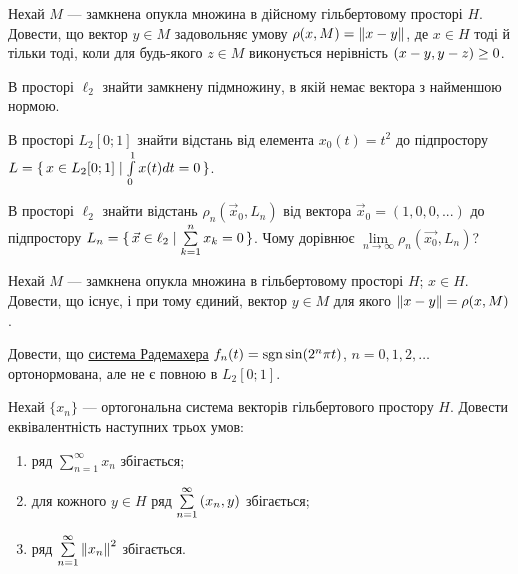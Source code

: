 \begin{exercise}
    Нехай $M$ --- замкнена опукла множина в дійсному гільбертовому просторі $H$.
    Довести, що вектор $y \in M$ задовольняє умову $\rho(x, M) = \left\lVert x-y\right\rVert$,
    де $x \in H$ тоді й тільки тоді, коли для будь-якого $z \in M$ виконується
    нерівність $\left(x-y, y-z\right) \geq 0$.
\end{exercise}

\begin{exercise}\label{N:1_2_21}
    В просторі $\ell_2$ знайти замкнену підмножину, в якій немає вектора з найменшою нормою.
\end{exercise}

\begin{exercise}
    В просторі $L_2[0;1]$ знайти відстань від елемента $x_0(t) = t^2$ до підпростору
    $L = \set{x \in L_2[0;1] \mid \int\limits_0^1x(t)dt = 0}$.
\end{exercise}

\begin{exercise}
    В просторі $\ell_2$ знайти відстань $\rho_n(\vec{x}_0, L_n)$ від вектора $\vec{x}_0 = (1, 0, 0, ...)$ до
    підпростору $L_n = \set{ \vec{x}\in \ell_2 \mid \sum\limits^n_{k=1} x_k = 0}$.
    Чому дорівнює $\lim\limits_{n \to \infty} \rho_n(\vec{x_0}, L_n)$?
\end{exercise}

\begin{exercise}\label{N:1_2_24}
    Нехай $M$ --- замкнена опукла множина в гільбертовому просторі $H$; $x \in H$.
    Довести, що існує, і при тому єдиний, вектор $y \in M$ для якого $\left\lVert x-y\right\rVert =
    \rho(x, M)$.
\end{exercise}

\begin{exercise}
    Довести, що \underline{система Радемахера} $f_n(t) = \operatorname{sgn}\sin(2^n \pi t)$,
    $n=0,1,2,\dots$ ортонормована, але не є повною в $L_2[0;1]$.
\end{exercise}

\begin{exercise}\label{N:1_2_26}
    Нехай $\{x_n\}$ --- ортогональна система векторів гільбертового простору $H$.
    Довести еквівалентність наступних трьох умов:
    \begin{enumerate}[label=\ukr*)]
        \item ряд $\sum\limits^\infty_{n=1} x_n$ збігається;
        \item для кожного $y \in H$ ряд $\sum\limits^\infty_{n=1} \left(x_n, y\right)$ збігається;
        \item ряд $\sum\limits^\infty_{n=1} \left\lVert x_n\right\rVert^2$ збігається.
    \end{enumerate}
\end{exercise}

